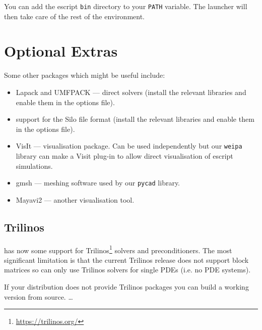 \begin{optionalstep}
You can add the escript \texttt{bin} directory to your \texttt{PATH} variable.
The launcher will then take care of the rest of the environment.
\end{optionalstep}

\section{Optional Extras}

Some other packages which might be useful include:
\begin{itemize}
 \item Lapack and UMFPACK --- direct solvers (install the relevant libraries and enable them in the options file).
 \item support for the Silo file format (install the relevant libraries and enable them in the options file).
 \item VisIt --- visualisation package. Can be used independently but our \texttt{weipa} library can make a Visit 
plug-in to allow direct visualisation of escript simulations.
 \item gmsh --- meshing software used by our \texttt{pycad} library.
 \item Mayavi2 --- another visualisation tool.
\end{itemize}


\subsection{Trilinos}
\escript has now some support for Trilinos\footnote{\url{https://trilinos.org/}}
solvers and preconditioners.
The most significant limitation is that the current Trilinos release does not
support block matrices so \escript can only use Trilinos solvers for single
PDEs (i.e. no PDE systems).

If your distribution does not provide Trilinos packages you can build a working
version from source.
\ldots

